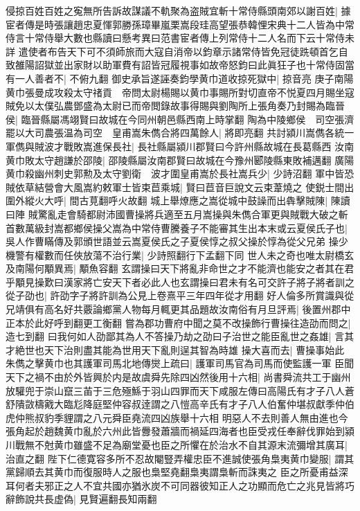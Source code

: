 侵掠百姓百姓之寃無所告訴故謀議不軌聚為盗賊宜斬十常侍縣頭南郊以謝百姓|{
	據宦者傳是時張讓趙忠夏惲郭勝孫璋畢嵐栗嵩段珪高望張恭韓悝宋典十二人皆為中常侍言十常侍舉大數也縣讀曰懸考異曰范書宦者傳上列常侍十二人名而下云十常侍未詳}
遣使者布告天下可不須師旅而大寇自消帝以鈞章示諸常侍皆免冠徒跣頓首乞自致雒陽詔獄並出家財以助軍費有詔皆冠履視事如故帝怒鈞曰此眞狂子也十常侍固當有一人善者不|{
	不俯九翻}
御史承旨遂誣奏鈞學黄巾道收掠死獄中|{
	掠音亮}
庚子南陽黄巾張曼成攻殺太守禇貢　帝問太尉楊賜以黄巾事賜所對切直帝不悦夏四月賜坐寇賊免以太僕弘農鄧盛為太尉已而帝閲錄故事得賜與劉陶所上張角奏乃封賜為臨晉侯|{
	臨晉縣屬馮翊賢曰故城在今同州朝邑縣西南上時掌翻}
陶為中陵鄉侯　司空張濟罷以大司農張温為司空　皇甫嵩朱儁合將四萬餘人|{
	將即亮翻}
共討潁川嵩儁各統一軍儁與賊波才戰敗嵩進保長社|{
	長社縣屬潁川郡賢曰今許州縣故城在長葛縣西}
汝南黄巾敗太守趙謙於邵陵|{
	邵陵縣屬汝南郡賢曰故城在今豫州郾陵縣東敗補邁翻}
廣陽黄巾殺幽州刺史郭勲及太守劉衛　波才圍皇甫嵩於長社嵩兵少|{
	少詩沼翻}
軍中皆恐賊依草結營會大風嵩約敕軍士皆束苣乘城|{
	賢曰苣音巨說文云束葦燒之}
使鋭士間出圍外縱火大呼|{
	間古莧翻呼火故翻}
城上舉燎應之嵩從城中鼓譟而出犇擊賊陳|{
	陳讀曰陣}
賊驚亂走會騎都尉沛國曹操將兵適至五月嵩操與朱儁合軍更與賊戰大破之斬首數萬級封嵩都鄉侯操父嵩為中常侍曹騰養子不能審其生出本末或云夏侯氏子也|{
	吳人作曹瞞傳及郭頒世語並云嵩夏侯氏之子夏侯惇之叔父操於惇為從父兄弟}
操少機警有權數而任俠放蕩不治行業|{
	少詩照翻行下孟翻下同}
世人未之奇也唯太尉橋玄及南陽何顒異焉|{
	顒魚容翻}
玄謂操曰天下將亂非命世之才不能濟也能安之者其在君乎顒見操歎曰漢家將亡安天下者必此人也玄謂操曰君未有名可交許子將子將者訓之從子劭也|{
	許劭字子將許訓為公見上卷熹平三年四年從才用翻}
好人倫多所賞識與從兄靖俱有高名好共覈論鄉黨人物每月輒更其品題故汝南俗有月旦評焉|{
	後置州郡中正本於此好呼到翻更工衡翻}
嘗為郡功曹府中聞之莫不改操飾行曹操往造劭而問之|{
	造七到翻}
曰我何如人劭鄙其為人不答操乃劫之劭曰子治世之能臣亂世之姦雄|{
	言其才絶世也天下治則盡其能為世用天下亂則逞其智為時雄}
操大喜而去|{
	曹操事始此}
朱儁之擊黄巾也其護軍司馬北地傳爕上疏曰|{
	護軍司馬官為司馬而使監護一軍}
臣聞天下之禍不由於外皆興於内是故虞舜先除四凶然後用十六相|{
	尚書舜流共工于幽州放驩兜于崇山竄三苖于三危殛鯀于羽山四罪而天下咸服左傳曰高陽氏有才子八人蒼舒隤敳檮戭大臨尨降庭堅仲容叔逹謂之八愷高辛氏有才子八人伯奮仲堪叔獻季仲伯虎仲熊叔豹季貍謂之八元舜臣堯流四凶族舉十六相}
明惡人不去則善人無由進也今張角起於趙魏黄巾亂於六州此皆釁發蕭牆而禍延四海者也臣受戎任奉辭伐罪始到潁川戰無不尅黄巾雖盛不足為廟堂憂也臣之所懼在於治水不自其源末流彌增其廣耳|{
	治直之翻}
陛下仁德寛容多所不忍故閹豎弄權忠臣不進誠使張角梟夷黄巾變服|{
	謂其黨歸順去其黄巾而復服時人之服也梟堅堯翻梟夷謂梟斬而誅夷之}
臣之所憂甫益深耳何者夫邪正之人不宜共國亦猶氷炭不可同器彼知正人之功顯而危亡之兆見皆將巧辭飾說共長虚偽|{
	見賢遍翻長知兩翻}
